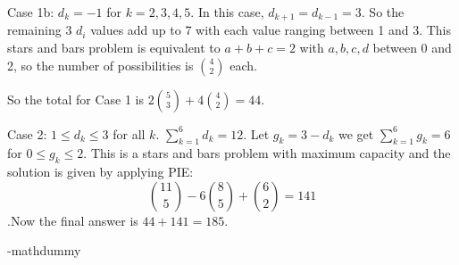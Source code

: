 \begin{enumerate}
 Case 1b: $d_k = -1$ for $k=2,3,4,5$. In this case, $d_{k+1}=d_{k-1} =3$. So the remaining 3 $d_i$ values add up to 7 with each value ranging between 1 and 3. This stars and bars problem is equivalent to $a+b+c =2$ with $a,b,c,d$ between 0 and 2, so the number of possibilities is ${4 \choose 2}$ each.

 So the total for Case 1 is $2{5 \choose 3} + 4 {4 \choose 2} = 44$.

 Case 2: $1 \leq d_k \leq 3$ for all $k$. $\sum_{k=1}^{6} d_k = 12$. Let $g_k = 3-d_k$ we get $\sum_{k=1}^{6} g_k = 6$ for $0 \leq g_k \leq 2$. This is a stars and bars problem with maximum capacity and the solution is given by applying PIE:
 \[{11 \choose 5} - 6{8 \choose 5} + {6 \choose 2} = 141\].Now the final answer is $44 + 141 = 185$.

 -mathdummy

 


\end{enumerate}